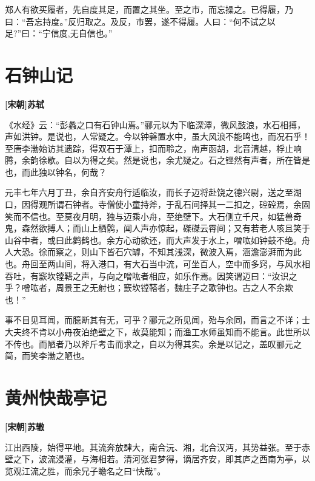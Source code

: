 \documentclass[UTF8,titlepage,oneside]{ctexbook}
\begin{document}
郑人有欲买履者，先自度其足，而置之其坐。至之市，而忘操之。已得履，乃曰：“吾忘持度。”反归取之。及反，市罢，遂不得履。人曰：“何不试之以足?”曰：“宁信度,无自信也。”



\chapter*{石钟山记}
\begin{center}
	\textbf{[宋朝]苏轼}
\end{center}

《水经》云：“彭蠡之口有石钟山焉。”郦元以为下临深潭，微风鼓浪，水石相搏，声如洪钟。是说也，人常疑之。今以钟磬置水中，虽大风浪不能鸣也，而况石乎！至唐李渤始访其遗踪，得双石于潭上，扣而聆之，南声函胡，北音清越，桴止响腾，余韵徐歇。自以为得之矣。然是说也，余尤疑之。石之铿然有声者，所在皆是也，而此独以钟名，何哉？


元丰七年六月丁丑，余自齐安舟行适临汝，而长子迈将赴饶之德兴尉，送之至湖口，因得观所谓石钟者。寺僧使小童持斧，于乱石间择其一二扣之，硿硿焉，余固笑而不信也。至莫夜月明，独与迈乘小舟，至绝壁下。大石侧立千尺，如猛兽奇鬼，森然欲搏人；而山上栖鹘，闻人声亦惊起，磔磔云霄间；又有若老人咳且笑于山谷中者，或曰此鹳鹤也。余方心动欲还，而大声发于水上，噌吰如钟鼓不绝。舟人大恐。徐而察之，则山下皆石穴罅，不知其浅深，微波入焉，涵澹澎湃而为此也。舟回至两山间，将入港口，有大石当中流，可坐百人，空中而多窍，与风水相吞吐，有窾坎镗鞳之声，与向之噌吰者相应，如乐作焉。因笑谓迈曰：“汝识之乎？噌吰者，周景王之无射也；窾坎镗鞳者，魏庄子之歌钟也。古之人不余欺也！”


事不目见耳闻，而臆断其有无，可乎？郦元之所见闻，殆与余同，而言之不详；士大夫终不肯以小舟夜泊绝壁之下，故莫能知；而渔工水师虽知而不能言。此世所以不传也。而陋者乃以斧斤考击而求之，自以为得其实。余是以记之，盖叹郦元之简，而笑李渤之陋也。



\chapter*{黄州快哉亭记}
\begin{center}
	\textbf{[宋朝]苏辙}
\end{center}

江出西陵，始得平地。其流奔放肆大，南合沅、湘，北合汉沔，其势益张。至于赤壁之下，波流浸灌，与海相若。清河张君梦得，谪居齐安，即其庐之西南为亭，以览观江流之胜，而余兄子瞻名之曰“快哉”。
\end{document}
